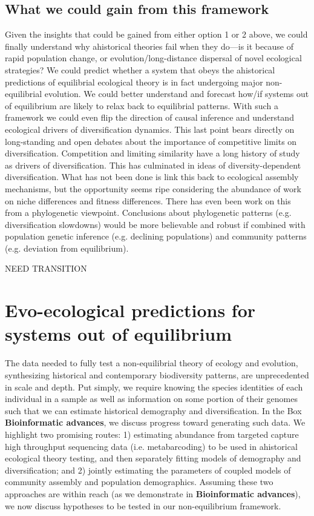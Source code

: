 \documentclass[12pt]{article}
\begin{document}
\subsection{What we could gain from this framework}

Given the insights that could be gained from either option 1 or 2
above, we could finally understand why ahistorical theories fail when
they do---is it because of rapid population change, or
evolution/long-distance dispersal of novel ecological strategies? We
could predict whether a system that obeys the ahistorical predictions
of equilibrial ecological theory is in fact undergoing major
non-equilibrial evolution. We could better understand and forecast
how/if systems out of equilibrium are likely to relax back to
equilibrial patterns. With such a framework we could even flip the
direction of causal inference and understand ecological drivers of
diversification dynamics. This last point bears directly on
long-standing and open debates about the importance of competitive
limits on diversification. Competition and limiting similarity have a
long history of study as drivers of diversification. This has
culminated in ideas of diversity-dependent
diversification\cite{Etienne2012-ky, Rabosky2013-gk, Rabosky2008-bs}.
What has not been done is link this back to ecological assembly
mechanisms, but the opportunity seems ripe considering the abundance
of work on niche differences and fitness
differences\cite{Chesson2000-uc, Adler2007-pl, HilleRisLambers2012-xt,
  Levine2009-qj}.  There has even been work on this from a
phylogenetic viewpoint\cite{Mayfield2010-hg, Godoy2014-iv}.
Conclusions about phylogenetic patterns (e.g. diversification
slowdowns) would be more believable and robust if combined with
population genetic inference (e.g. declining populations) and
community patterns (e.g.  deviation from equilibrium).

NEED TRANSITION

\section{Evo-ecological predictions for systems out of equilibrium}

The data needed to fully test a non-equilibrial theory of ecology and
evolution, synthesizing historical and contemporary biodiversity
patterns, are unprecedented in scale and depth. Put simply, we require
knowing the species identities of each individual in a sample as well
as information on some portion of their genomes such that we can
estimate historical demography and diversification. In the Box
\textbf{Bioinformatic advances}, we discuss progress toward generating
such data. We highlight two promising routes: 1) estimating abundance
from targeted capture high throughput sequencing data (i.e.
metabarcoding) to be used in ahistorical ecological theory testing,
and then separately fitting models of demography and diversification;
and 2) jointly estimating the parameters of coupled models of
community assembly and population demographics. Assuming these two
approaches are within reach (as we demonstrate in
\textbf{Bioinformatic advances}), we now discuss hypotheses to be
tested in our non-equilibrium framework.
\end{document}
